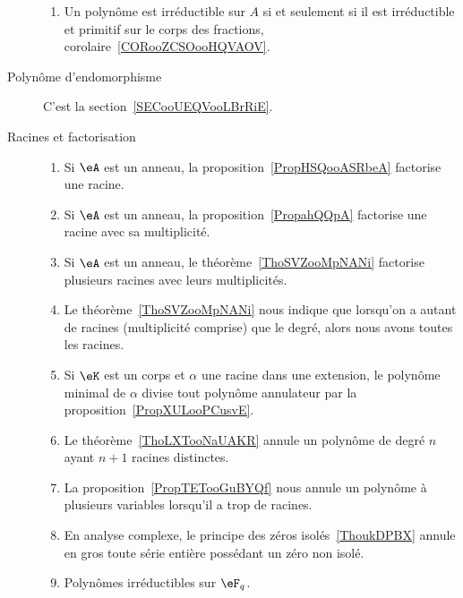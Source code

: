 \begin{description}
	      \begin{enumerate}
		      \item
		            Un polynôme est irréductible sur \( A\) si et seulement si il est irréductible et primitif sur le corps des fractions, corolaire~\ref{CORooZCSOooHQVAOV}.
	      \end{enumerate}

	\item[Polynôme d'endomorphisme]
	      C'est la section~\ref{SECooUEQVooLBrRiE}.

	\item[Racines et factorisation]

	      \begin{enumerate}
		      \item
		            Si \( \eA\) est un anneau, la proposition~\ref{PropHSQooASRbeA} factorise une racine.
		      \item
		            Si \( \eA\) est un anneau, la proposition~\ref{PropahQQpA} factorise une racine avec sa multiplicité.
		      \item
		            Si \( \eA\) est un anneau, le théorème~\ref{ThoSVZooMpNANi} factorise plusieurs racines avec leurs multiplicités.
		      \item
		            Le théorème~\ref{ThoSVZooMpNANi} nous indique que lorsqu'on a autant de racines (multiplicité comprise) que le degré, alors nous avons toutes les racines.
		      \item
		            Si \( \eK\) est un corps et \( \alpha\) une racine dans une extension, le polynôme minimal de \( \alpha\) divise tout polynôme annulateur par la proposition~\ref{PropXULooPCusvE}.
		      \item
		            Le théorème~\ref{ThoLXTooNaUAKR} annule un polynôme de degré \( n\) ayant \( n+1\) racines distinctes.
		      \item
		            La proposition~\ref{PropTETooGuBYQf} nous annule un polynôme à plusieurs variables lorsqu'il a trop de racines.
		      \item
		            En analyse complexe, le principe des zéros isolés~\ref{ThoukDPBX} annule en gros toute série entière possédant un zéro non isolé.
		      \item
		            Polynômes irréductibles sur \( \eF_q\).
	      \end{enumerate}

\end{description}

